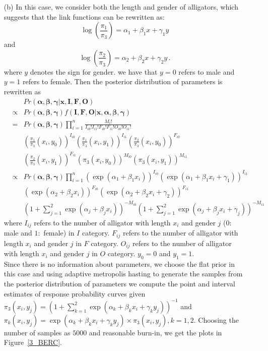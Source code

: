 \documentclass[]{article}
\begin{document}
\begin{enumerate}
{\begin{itemize}
        	\item[(b)]
        	In this case, we consider both the length and gender of alligators, which suggests that the link functions can be rewritten as:
        	$$\log(\frac{\pi_1}{\pi_3}) = \alpha_1 + \beta_1 x + \gamma_1 y$$
        	and 
        	$$\log(\frac{\pi_2}{\pi_3}) = \alpha_2 + \beta_2 x + \gamma_2 y\,.$$
        	where $y$ denotes the sign for gender. we have that $y=0$ refers to male and $y=1$ refers to female. Then the posterior distribution of parameters is rewritten as
        	\begin{eqnarray}
        	& & Pr(\bm \alpha, \bm \beta, \bm \gamma| \bm x, \bm I, \bm F, \bm O)\\
        	 & \propto & Pr(\bm \alpha, \bm \beta, \bm \gamma) f(\bm I, \bm F, \bm O | \bm x, \bm \alpha, \bm \beta, \bm \gamma)\\
        	& = & Pr(\bm \alpha, \bm \beta, \bm \gamma) \prod_{i = 1}^{n}\frac{M_i!}{I_{i0}!I_{i1}!F_{i0}!F_{i1}!O_{i0}!O_{i1}!}\\
        	& &(\frac{\pi_1}{\pi_3}(x_i, y_0))^{I_{i0}}(\frac{\pi_1}{\pi_3}(x_i, y_1))^{I_{i1}}(\frac{\pi_2}{\pi_3}(x_i, y_0))^{F_{i0}} \\
        	& &(\frac{\pi_2}{\pi_3}(x_i, y_1))^{F_{i1}}(\pi_3(x_i,y_0))^{M_{i0}}(\pi_3(x_i,y_1))^{M_{i1}}\\
        	& \propto & Pr(\bm \alpha, \bm \beta, \bm \gamma) \prod_{i = 1}^{n}(\exp(\alpha_1 + \beta_1x_i))^{I_{i0}}(\exp(\alpha_1 + \beta_1x_i + \gamma_1))^{I_{i1}}\\
        	& & (\exp(\alpha_2 + \beta_2x_i))^{F_{i0}}(\exp(\alpha_2 + \beta_2x_i + \gamma_2))^{F_{i1}}\\
        	& & (1 + \sum_{j=1}^{2}\exp(\alpha_j + \beta_j x_i))^{-M_{i0}}(1 + \sum_{j=1}^{2}\exp(\alpha_j + \beta_j x_i + \gamma_j))^{-M_{i1}}
        	\end{eqnarray}
        	where $I_{ij}$ refers to the number of alligator with length $x_i$ and gender $j$ ($0:$ male and $1:$ female) in $I$ category. $F_{ij}$ refers to the number of alligator with length $x_i$ and gender $j$ in $F$ category. $O_{ij}$ refers to the number of alligator with length $x_i$ and gender $j$ in $O$ category. $y_0 =0$ and $y_1 = 1$. \\
        	Since there is no information about parameters, we choose the flat prior in this case and using adaptive metropolis hasting to generate the samples from the posterior distribution of parameters we compute the point and interval estimates of response probability curves given $\pi_3(x_i, y_j) = (1 + \sum_{k=1}^{2}\exp(\alpha_k + \beta_k x_i + \gamma_k y_j ))^{-1}$ and $\pi_k(x_i,y_j) = \exp(\alpha_k + \beta_k x_i + \gamma_k y_j) \times \pi_3(x_i, y_j), k = 1,2$. Choosing the number of samples as $5000$ and reasonable burn-in, we get the plots in Figure~\ref{3_BERC}.\\

\end{itemize}}
\end{enumerate}
\end{document}
